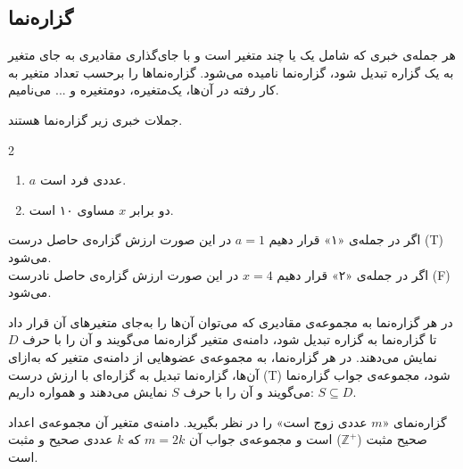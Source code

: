 \subsection{گزاره‌نما}
هر جمله‌ی خبری که شامل یک یا چند متغیر است و با جای‌گذاری مقادیری به جای متغیر به یک گزاره تبدیل شود، گزاره‌نما نامیده می‌شود. گزاره‌نماها را برحسب تعداد متغیر به کار رفته در آن‌ها، یک‌متغیره، دومتغیره و ... می‌نامیم.

\begin{example}
	جملات خبری زیر گزاره‌نما هستند.
	\vspace{-0.5cm}
	\begin{multicols}{2}
		\begin{enumerate}
			\item 
			$a$
			عددی فرد است.
			\item 
			دو برابر $x$ مساوی ۱۰ است.
		\end{enumerate}
	\end{multicols}
	اگر در جمله‌ی «۱» قرار دهیم
	$a=1$
	در این صورت ارزش گزاره‌ی حاصل درست (T) می‌شود. \\
	اگر در جمله‌ی «۲» قرار دهیم
	$x=4$
	در این صورت ارزش گزاره‌ی حاصل نادرست (F) می‌شود.
\end{example}
\smallskip
در هر گزاره‌نما به مجموعه‌ی مقادیری که می‌توان آن‌ها را به‌جای متغیرهای آن قرار داد تا گزاره‌نما به گزاره تبدیل شود، دامنه‌ی متغیر گزاره‌نما می‌گویند و آن را با حرف $D$ نمایش می‌دهند. در هر گزاره‌نما، به مجموعه‌ی عضوهایی از دامنه‌ی متغیر که به‌ازای آن‌ها، گزاره‌نما تبدیل به گزاره‌ای با ارزش درست (T) شود، مجموعه‌ی جواب گزاره‌نما می‌گویند و آن را با حرف $S$ نمایش می‌دهند و همواره داریم:
$S \subseteq D$.

\begin{example}
	گزاره‌نمای «$m$ عددی زوج است» را در نظر بگیرید. دامنه‌ی متغیر آن مجموعه‌ی اعداد صحیح مثبت
	($\mathbb{Z}^+$)
	است و مجموعه‌ی جواب آن
	$m=2k$
	که $k$ عددی صحیح و مثبت است. 
\end{example}

